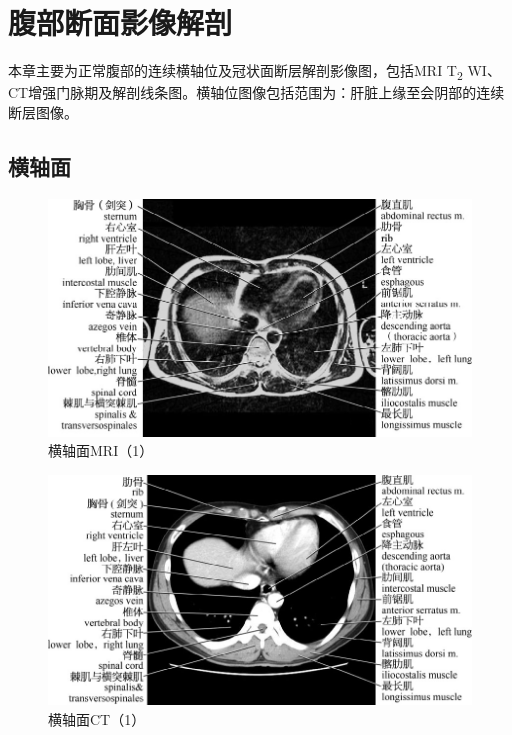 \chapter{腹部断面影像解剖}

本章主要为正常腹部的连续横轴位及冠状面断层解剖影像图，包括MRI
T\textsubscript{2}
WI、CT增强门脉期及解剖线条图。横轴位图像包括范围为：肝脏上缘至会阴部的连续断层图像。

\section{横轴面}

\begin{figure}[!htbp]
 \centering
 \includegraphics{./images/Image00002.jpg}
 \captionsetup{justification=centering}
 \caption{横轴面MRI（1）}
  \end{figure} 
 \FloatBarrier

\begin{figure}[!htbp]
 \centering
 \includegraphics{./images/Image00003.jpg}
 \captionsetup{justification=centering}
 \caption{横轴面CT（1）}
  \end{figure} 
 \FloatBarrier

